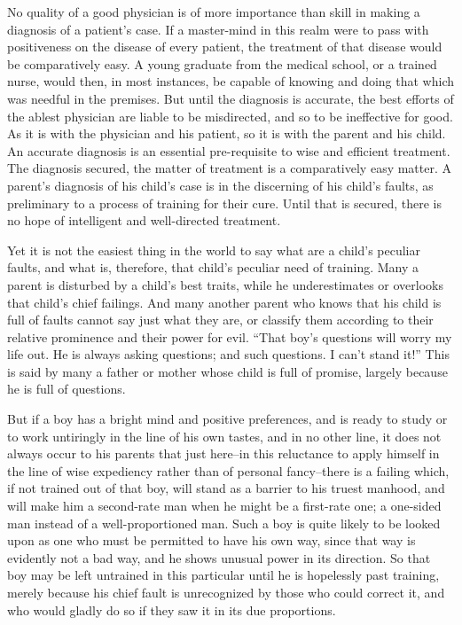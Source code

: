 \documentclass[
]{book}
\begin{document}
No quality of a good physician is of more importance than skill in making a diagnosis of a patient's case. If a master-mind in this realm were to pass with positiveness on the disease of every patient, the treatment of that disease would be comparatively easy. A young graduate from the medical school, or a trained nurse, would then, in most instances, be capable of knowing and doing that which was needful in the premises. But until the diagnosis is accurate, the best efforts of the ablest physician are liable to be misdirected, and so to be ineffective for good. As it is with the physician and his patient, so it is with the parent and his child. An accurate diagnosis is an essential pre-requisite to wise and efficient treatment. The diagnosis secured, the matter of treatment is a comparatively easy matter. A parent's diagnosis of his child's case is in the discerning of his child's faults, as preliminary to a process of training for their cure. Until that is secured, there is no hope of intelligent and well-directed treatment.

Yet it is not the easiest thing in the world to say what are a child's peculiar faults, and what is, therefore, that child's peculiar need of training. Many a parent is disturbed by a child's best traits, while he underestimates or overlooks that child's chief failings. And many another parent who knows that his child is full of faults cannot say just what they are, or classify them according to their relative prominence and their power for evil. ``That boy's questions will worry my life out. He is always asking questions; and such questions. I can't stand it!'' This is said by many a father or mother whose child is full of promise, largely because he is full of questions.

But if a boy has a bright mind and positive preferences, and is ready to study or to work untiringly in the line of his own tastes, and in no other line, it does not always occur to his parents that just here--in this reluctance to apply himself in the line of wise expediency rather than of personal fancy--there is a failing which, if not trained out of that boy, will stand as a barrier to his truest manhood, and will make him a second-rate man when he might be a first-rate one; a one-sided man instead of a well-proportioned man. Such a boy is quite likely to be looked upon as one who must be permitted to have his own way, since that way is evidently not a bad way, and he shows unusual power in its direction. So that boy may be left untrained in this particular until he is hopelessly past training, merely because his chief fault is unrecognized by those who could correct it, and who would gladly do so if they saw it in its due proportions.
\end{document}
